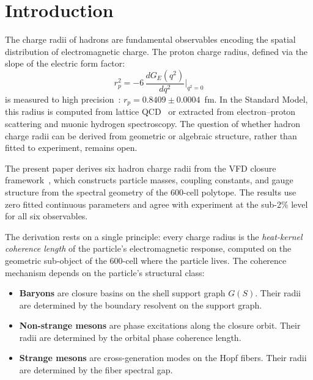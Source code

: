 \documentclass[12pt]{article}
\begin{document}
\section{Introduction}\label{sec:intro}

The charge radii of hadrons are fundamental observables encoding the spatial distribution of electromagnetic charge. The proton charge radius, defined via the slope of the electric form factor:
\begin{equation}\label{eq:radius_def}
    r_p^2 = -6\,\frac{dG_E(q^2)}{dq^2}\bigg|_{q^2=0}
\end{equation}
is measured to high precision~\citep{Workman2022}: $r_p = 0.8409 \pm 0.0004$~fm. In the Standard Model, this radius is computed from lattice QCD~\citep{Durr2008} or extracted from electron--proton scattering and muonic hydrogen spectroscopy. The question of whether hadron charge radii can be derived from geometric or algebraic structure, rather than fitted to experiment, remains open.

The present paper derives six hadron charge radii from the VFD closure framework~\citep{SmartIV, SmartVIII, SmartXXII}, which constructs particle masses, coupling constants, and gauge structure from the spectral geometry of the 600-cell polytope. The results use zero fitted continuous parameters and agree with experiment at the sub-2\% level for all six observables.

The derivation rests on a single principle: every charge radius is the \textit{heat-kernel coherence length} of the particle's electromagnetic response, computed on the geometric sub-object of the 600-cell where the particle lives. The coherence mechanism depends on the particle's structural class:
\begin{itemize}
    \item \textbf{Baryons} are closure basins on the shell support graph $G(S)$. Their radii are determined by the boundary resolvent on the support graph.
    \item \textbf{Non-strange mesons} are phase excitations along the closure orbit. Their radii are determined by the orbital phase coherence length.
    \item \textbf{Strange mesons} are cross-generation modes on the Hopf fibers. Their radii are determined by the fiber spectral gap.
\end{itemize}
\end{document}
